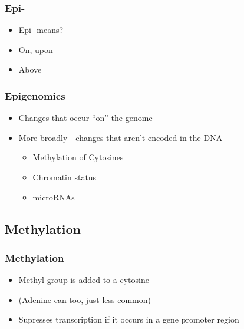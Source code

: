 \documentclass[14pt]{beamer}
\begin{document}
\begin{frame}
\frametitle{Epi-}
\begin{itemize}
	\item<+-> Epi- means?
	\item<+-> On, upon
	\item<+-> Above
\end{itemize}
\end{frame}

\begin{frame}
\frametitle{Epigenomics}
\begin{itemize}
	\item<+-> Changes that occur ``on'' the genome
	\item<+-> More broadly - changes that aren't encoded in the DNA
	\begin{itemize}
		\item<+-> Methylation of Cytosines
		\item<+-> Chromatin status
		\item<+-> microRNAs
	\end{itemize}
\end{itemize}
\end{frame}

\subsection{Methylation}

\begin{frame}
\frametitle{Methylation}
\begin{itemize}
	\item<+-> Methyl group is added to a cytosine
	\item<+-> (Adenine can too, just less common)
	\item<+-> Supresses transcription if it occurs in a gene promoter region
\end{itemize}
\end{frame}
\end{document}

